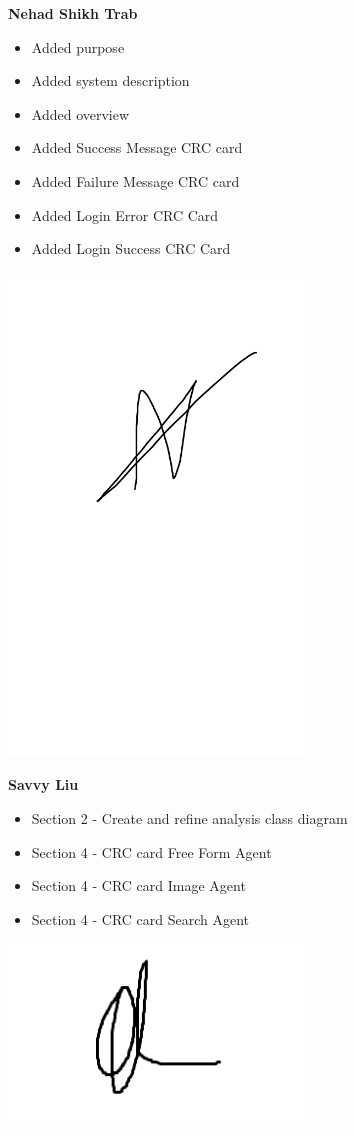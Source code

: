 \documentclass[]{article}
\begin{document}
\textbf{Nehad Shikh Trab}
\begin{itemize}
    \setlength\itemindent{2em}
\item Added purpose
\item Added system description
\item Added overview
\item Added Success Message CRC card
\item Added Failure Message CRC card
\item Added Login Error CRC Card
\item Added Login Success CRC Card
\end{itemize}
\includegraphics[width=0.6\textwidth]{Nehad.png}

\textbf{Savvy Liu}
\begin{itemize}
    \setlength\itemindent{2em}
    \item Section 2 - Create and refine analysis class diagram
    \item Section 4 - CRC card Free Form Agent
    \item Section 4 - CRC card Image Agent
    \item Section 4 - CRC card Search Agent
\end{itemize} 
\includegraphics[width=0.6\textwidth]{Savvy.png}
\end{document}

